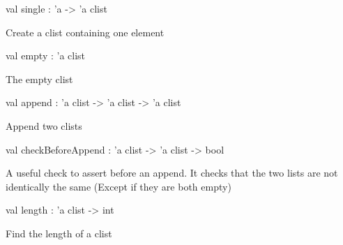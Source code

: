 \documentclass[11pt]{article}
\begin{document}
\label{val:Clist.single}\begin{ocamldoccode}
val single : 'a -> 'a clist
\end{ocamldoccode}
\begin{ocamldocdescription}
Create a clist containing one element


\end{ocamldocdescription}




\label{val:Clist.empty}\begin{ocamldoccode}
val empty : 'a clist
\end{ocamldoccode}
\begin{ocamldocdescription}
The empty clist


\end{ocamldocdescription}




\label{val:Clist.append}\begin{ocamldoccode}
val append : 'a clist -> 'a clist -> 'a clist
\end{ocamldoccode}
\begin{ocamldocdescription}
Append two clists


\end{ocamldocdescription}




\label{val:Clist.checkBeforeAppend}\begin{ocamldoccode}
val checkBeforeAppend : 'a clist -> 'a clist -> bool
\end{ocamldoccode}
\begin{ocamldocdescription}
A useful check to assert before an append. It checks that the two lists 
 are not identically the same (Except if they are both empty)


\end{ocamldocdescription}




\label{val:Clist.length}\begin{ocamldoccode}
val length : 'a clist -> int
\end{ocamldoccode}
\begin{ocamldocdescription}
Find the length of a clist


\end{ocamldocdescription}
\end{document}
